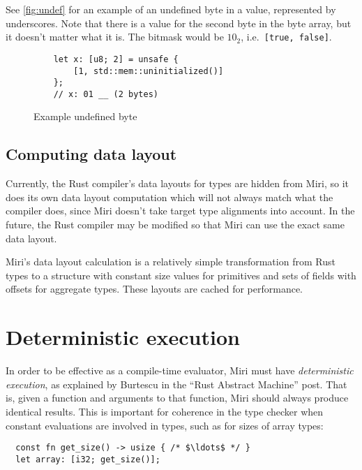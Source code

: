 \documentclass[twocolumn]{article}
\newcommand{\rust}[1]{\texttt{#1}}
\begin{document}
See \autoref{fig:undef} for an example of an undefined byte in a value, represented by underscores.
Note that there is a value for the second byte in the byte array, but it doesn't matter what it is.
The bitmask would be $10_2$, i.e.\ \rust{[true, false]}.

\begin{figure}[hb]
  \begin{verbatim}
    let x: [u8; 2] = unsafe {
        [1, std::mem::uninitialized()]
    };
    // x: 01 __ (2 bytes)
  \end{verbatim}
  \caption{Example undefined byte}
  \label{fig:undef}
\end{figure}

\subsection{Computing data layout}

Currently, the Rust compiler's data layouts for types are hidden from Miri, so it does its own data
layout computation which will not always match what the compiler does, since Miri doesn't take
target type alignments into account. In the future, the Rust compiler may be modified so that Miri
can use the exact same data layout.

Miri's data layout calculation is a relatively simple transformation from Rust types to a structure
with constant size values for primitives and sets of fields with offsets for aggregate types. These
layouts are cached for performance.


\section{Deterministic execution}
\label{sec:deterministic}

In order to be effective as a compile-time evaluator, Miri must have \emph{deterministic execution},
as explained by Burtescu in the ``Rust Abstract Machine'' post. That is, given a function and
arguments to that function, Miri should always produce identical results. This is important for
coherence in the type checker when constant evaluations are involved in types, such as for sizes of
array types:

\begin{verbatim}
  const fn get_size() -> usize { /* $\ldots$ */ }
  let array: [i32; get_size()];
\end{verbatim}
\end{document}
